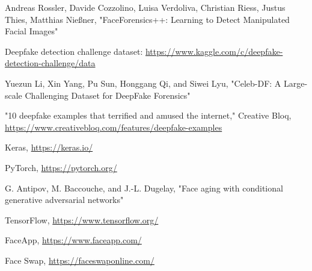 \begin{thebibliography}{99}

     Andreas Rossler, Davide Cozzolino, Luisa Verdoliva, Christian Riess, Justus Thies, Matthias Nießner, "FaceForensics++: Learning to Detect Manipulated Facial Images"

     Deepfake detection challenge dataset: \url{https://www.kaggle.com/c/deepfake-detection-challenge/data}

     Yuezun Li, Xin Yang, Pu Sun, Honggang Qi, and Siwei Lyu, "Celeb-DF: A Large-scale Challenging Dataset for DeepFake Forensics"

     "10 deepfake examples that terrified and amused the internet," Creative Bloq, \url{https://www.creativebloq.com/features/deepfake-examples}

     Keras, \url{https://keras.io/}

     PyTorch, \url{https://pytorch.org/}

     G. Antipov, M. Baccouche, and J.-L. Dugelay, "Face aging with conditional generative adversarial networks"

     TensorFlow, \url{https://www.tensorflow.org/}

     FaceApp, \url{https://www.faceapp.com/}

     Face Swap, \url{https://faceswaponline.com/}

\end{thebibliography}
